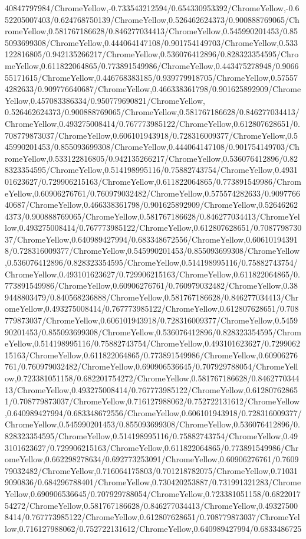 {\begin{tikzternal}
{40847797984/ChromeYellow,-0.733543212594/0.654330953392/ChromeYellow,-0.652205007403/0.624768750139/ChromeYellow,0.526462624373/0.900888769065/ChromeYellow,0.581767186628/0.846277034413/ChromeYellow,0.545990201453/0.855093699308/ChromeYellow,0.444064147108/0.901754149703/ChromeYellow,0.533122816805/0.942135266217/ChromeYellow,0.536076412896/0.828323354595/ChromeYellow,0.611822064865/0.773891549986/ChromeYellow,0.443475278948/0.906655171615/ChromeYellow,0.446768383185/0.939779918705/ChromeYellow,0.575574282633/0.909776640687/ChromeYellow,0.466338361798/0.901625892909/ChromeYellow,0.457083386334/0.950779690821/ChromeYellow,
0.526462624373/0.900888769065/ChromeYellow,0.581767186628/0.846277034413/ChromeYellow,0.493275008414/0.767773985122/ChromeYellow,0.612807628651/0.708779873037/ChromeYellow,0.606101943918/0.728316009377/ChromeYellow,0.545990201453/0.855093699308/ChromeYellow,0.444064147108/0.901754149703/ChromeYellow,0.533122816805/0.942135266217/ChromeYellow,0.536076412896/0.828323354595/ChromeYellow,0.514198995116/0.75882743754/ChromeYellow,0.493101623627/0.729906215163/ChromeYellow,0.611822064865/0.773891549986/ChromeYellow,0.60906276761/0.760979032482/ChromeYellow,0.575574282633/0.909776640687/ChromeYellow,0.466338361798/0.901625892909/ChromeYellow,0.526462624373/0.900888769065/ChromeYellow,0.581767186628/0.846277034413/ChromeYellow,0.493275008414/0.767773985122/ChromeYellow,0.612807628651/0.708779873037/ChromeYellow,0.640989427994/0.683348672556/ChromeYellow,0.606101943918/0.728316009377/ChromeYellow,0.545990201453/0.855093699308/ChromeYellow,0.536076412896/0.828323354595/ChromeYellow,0.514198995116/0.75882743754/ChromeYellow,0.493101623627/0.729906215163/ChromeYellow,0.611822064865/0.773891549986/ChromeYellow,0.60906276761/0.760979032482/ChromeYellow,0.389448803479/0.840568236888/ChromeYellow,0.581767186628/0.846277034413/ChromeYellow,0.493275008414/0.767773985122/ChromeYellow,0.612807628651/0.708779873037/ChromeYellow,0.606101943918/0.728316009377/ChromeYellow,0.545990201453/0.855093699308/ChromeYellow,0.536076412896/0.828323354595/ChromeYellow,0.514198995116/0.75882743754/ChromeYellow,0.493101623627/0.729906215163/ChromeYellow,0.611822064865/0.773891549986/ChromeYellow,0.60906276761/0.760979032482/ChromeYellow,0.690906536645/0.707929788054/ChromeYellow,0.723381051158/0.682201754272/ChromeYellow,0.581767186628/0.846277034413/ChromeYellow,0.493275008414/0.767773985122/ChromeYellow,0.612807628651/0.708779873037/ChromeYellow,0.716127988062/0.752722131612/ChromeYellow,0.640989427994/0.683348672556/ChromeYellow,0.606101943918/0.728316009377/ChromeYellow,0.545990201453/0.855093699308/ChromeYellow,0.536076412896/0.828323354595/ChromeYellow,0.514198995116/0.75882743754/ChromeYellow,0.493101623627/0.729906215163/ChromeYellow,0.611822064865/0.773891549986/ChromeYellow,0.662298278634/0.692773253091/ChromeYellow,0.60906276761/0.760979032482/ChromeYellow,0.716064175803/0.701218782075/ChromeYellow,0.710319090836/0.684296788401/ChromeYellow,0.730420253887/0.731991321283/ChromeYellow,0.690906536645/0.707929788054/ChromeYellow,0.723381051158/0.682201754272/ChromeYellow,0.581767186628/0.846277034413/ChromeYellow,0.493275008414/0.767773985122/ChromeYellow,0.612807628651/0.708779873037/ChromeYellow,0.716127988062/0.752722131612/ChromeYellow,0.640989427994/0.6833486725}
\end{tikzternal}}
